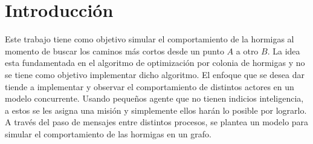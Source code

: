 \documentclass[
12pt, %
letterpaper, %
oneside, %
headinclude,footinclude, %
BCOR5mm, %
]{scrartcl}
\begin{document}






\newpage %


\section{Introducción}

Este trabajo tiene como objetivo simular el comportamiento de la hormigas al momento de buscar los caminos más cortos desde un punto $A$ a otro $B$. La idea esta fundamentada en el algoritmo de optimización por colonia de hormigas\cite{Colorni91distributedoptimization} y no se tiene como objetivo implementar dicho algoritmo. El enfoque que se desea dar tiende a implementar y observar el comportamiento de distintos actores en un modelo concurrente. Usando pequeños agente que no tienen indicios inteligencia, a estos se les asigna una misión y simplemente ellos harán lo posible por lograrlo. A través del paso de mensajes entre distintos procesos, se plantea un modelo para simular el comportamiento de las hormigas en un grafo.
\end{document}
